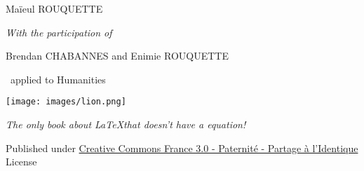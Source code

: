 \newpage\begin{center}
\parindent=0pt

{\Large Maïeul ROUQUETTE}
\vspace{0.5ex}

{\footnotesize \emph{With the participation of}}

\vspace{0.5ex}

{Brendan CHABANNES and Enimie ROUQUETTE}

\vspace{8ex}
{\LARGE\logo~applied to Humanities}

\vspace{10ex}
\texttt{[image: images/lion.png]}
\vspace{3ex}

{\large \emph{The only book about \LaTeX that doesn't have a equation!}}

\vspace{28ex}



{\small Published under  \href{http://creativecommons.org/licenses/by-sa/3.0/fr/}{Creative Commons France 3.0 - Paternité - Partage à l'Identique} License}
\end{center}
\newpage